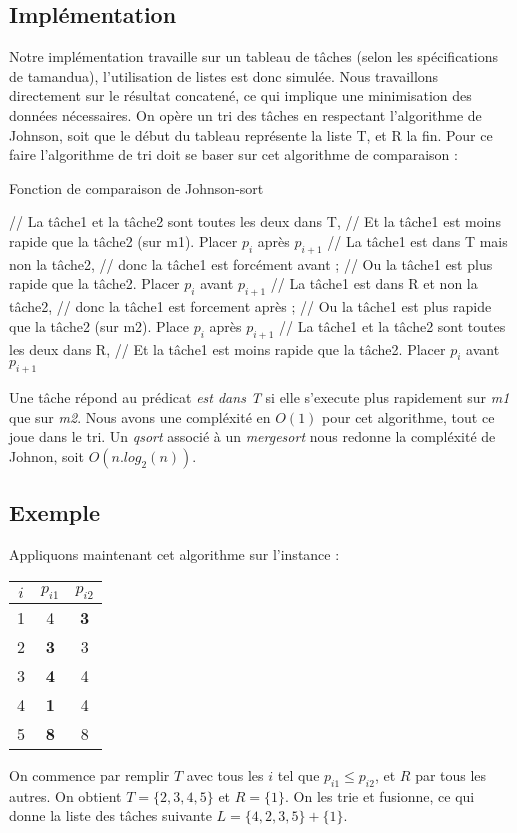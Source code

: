 \subsection{Implémentation}
Notre implémentation travaille sur un tableau de tâches (selon les spécifications de
tamandua), l'utilisation de listes est donc simulée.
Nous travaillons directement sur le résultat concatené, ce qui implique une
minimisation des données nécessaires. On opère un tri des tâches en respectant
l'algorithme de Johnson, soit que le début du tableau représente la liste T,
et R la fin. Pour ce faire l'algorithme de tri doit se baser sur cet algorithme
de comparaison :
\begin{algorithm}
\caption{Fonction de comparaison de Johnson-sort}
\begin{algorithmic}
		\STATE // La tâche1 et la tâche2 sont toutes les deux dans T,
		\STATE // Et la tâche1 est moins rapide que la tâche2 (sur m1).
		\STATE Placer $p_i$ après $p_{i+1}$
	\ELSE
		\STATE // La tâche1 est dans T mais non la tâche2,
		\STATE // donc la tâche1 est forcément avant ;
		\STATE // Ou la tâche1 est plus rapide que la tâche2.
		\STATE Placer $p_i$ avant $p_{i+1}$
	\ENDIF
\ELSE
		\STATE // La tâche1 est dans R et non la tâche2,
		\STATE // donc la tâche1 est forcement après ;
		\STATE // Ou la tâche1 est plus rapide que la tâche2 (sur m2).
		\STATE Place $p_i$ après $p_{i+1}$
	\ELSE
		\STATE // La tâche1 et la tâche2 sont toutes les deux dans R,
		\STATE // Et la tâche1 est moins rapide que la tâche2.
		\STATE Placer $p_i$ avant $p_{i+1}$
	\ENDIF
\ENDIF
\end{algorithmic}
\end{algorithm}

Une tâche répond au prédicat {\em est dans T} si elle s'execute plus rapidement
sur {\em m1} que sur {\em m2}.
Nous avons une compléxité en $O(1)$ pour cet algorithme, tout ce joue dans le
tri. Un {\em qsort} associé à un {\em mergesort} nous redonne la compléxité
de Johnon, soit $O(n.log_2(n))$.


\subsection{Exemple}
Appliquons maintenant cet algorithme sur l'instance :

\begin{center}
\begin{tabular}{|c|c|c|}
\hline
$i$ & $p_{i1}$ & $p_{i2}$ \\
\hline
1 & 4 & \textbf{3} \\
\hline
2 & \textbf{3} & 3 \\
\hline
3 & \textbf{4} & 4 \\
\hline
4 & \textbf{1} & 4 \\
\hline
5 & \textbf{8} & 8 \\
\hline
\end{tabular}
\end{center}

On commence par remplir $T$ avec tous les $i$ tel que $p_{i1} \le p_{i2}$, et
$R$ par tous les autres.
On obtient $T = \{2,3,4,5\}$ et $R = \{1\}$.
On les trie et fusionne, ce qui donne la liste des tâches 
suivante $L = \{4,2,3,5\} + \{1\}$.
